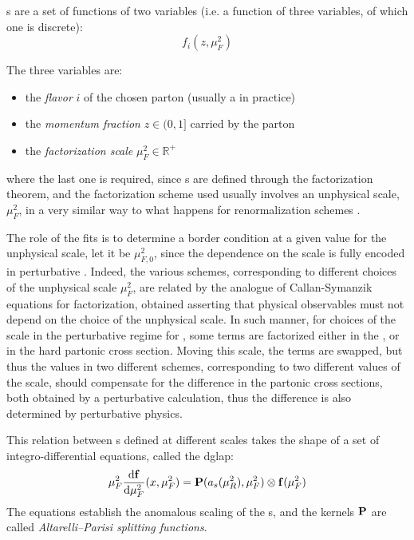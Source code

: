 
\pdf{}s are a set of functions of two variables (i.e. a function of three
variables, of which one is discrete):
\begin{equation}
  f_i(z, \mu_F^2)
\end{equation}

The three variables are:
\begin{itemize}
  \item the \textit{flavor} $i$ of the chosen parton (usually a \pid in practice)
  \item the \textit{momentum fraction} $z \in (0,1]$ carried by the parton
  \item the \textit{factorization scale} $\mu_F^2 \in \mathbb{R}^+$
\end{itemize}
where the last one is required, since \pdf{}s are defined through the
factorization theorem, and the factorization scheme used usually involves an
unphysical scale, $\mu_F^2$, in a very similar way to what happens for
renormalization schemes \cite{Ellis:1996mzs}.

The role of the \pdf fits is to determine a border condition at a given value
for the unphysical scale, let it be $\mu_{F,0}^2$, since the dependence on the
scale is fully encoded in perturbative \qcd.
%
Indeed, the various schemes, corresponding to different choices of the
unphysical scale $\mu_F^2$, are related by the analogue of Callan-Symanzik
equations for factorization, obtained asserting that physical observables must
not depend on the choice of the unphysical scale.
%
In such manner, for choices of the scale in the perturbative regime for \qcd,
some terms are factorized either in the \pdf, or in the hard partonic cross
section.
Moving this scale, the terms are swapped, but thus the \pdf values in two
different schemes, corresponding to two different values of the scale, should
compensate for the difference in the partonic cross sections, both obtained by
a perturbative calculation, thus the difference is also determined by
perturbative physics.

This relation between \pdf{}s defined at different scales takes the shape of a
set of integro-differential equations, called the \acrfull{dglap}:
\begin{equation}
	\muF^2 \dv{\vb f}{\muF^2}{}(x,\muF^2) = \vb P (a_s(\muR^2),\muF^2) \otimes \vb f(\muF^2)
	\label{eq:qcd/dglap}
\end{equation}
The equations establish the anomalous scaling of the \pdf{}s, and the kernels
${\vb P}$ are called \textit{Altarelli--Parisi splitting functions}.

